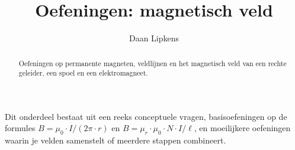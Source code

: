 \documentclass{ximera}
\title{Oefeningen: magnetisch veld}
\author{Daan Lipkens}
\begin{document}
\begin{abstract}
    Oefeningen op permanente magneten, veldlijnen en het magnetisch veld van een rechte geleider, een spoel en een elektromagneet.
\end{abstract}
\maketitle

Dit onderdeel bestaat uit een reeks conceptuele vragen, basisoefeningen op de formules $B = \mu_0 \cdot I/(2\pi \cdot r)$ en $B = \mu_r \cdot \mu_0 \cdot N \cdot I/\ell$, en moeilijkere oefeningen waarin je velden samenstelt of meerdere stappen combineert.
\end{document}
